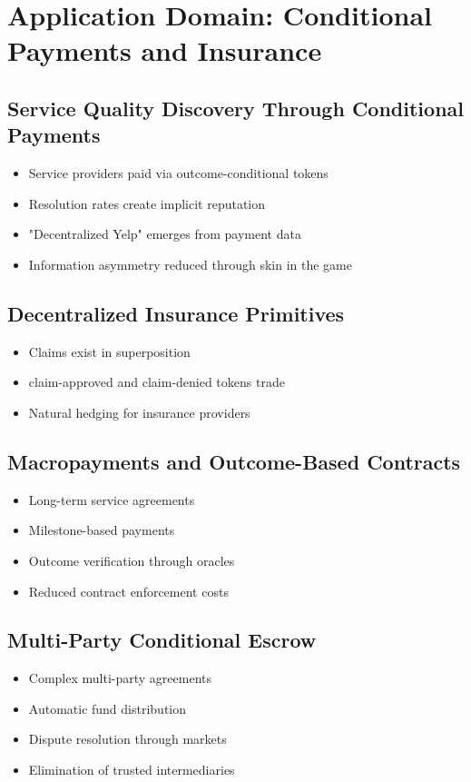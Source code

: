 \documentclass{article}
\begin{document}
\section{Application Domain: Conditional Payments and Insurance}
\subsection{Service Quality Discovery Through Conditional Payments}
\begin{itemize}
   \item Service providers paid via outcome-conditional tokens
   \item Resolution rates create implicit reputation
   \item "Decentralized Yelp" emerges from payment data
   \item Information asymmetry reduced through skin in the game
\end{itemize}

\subsection{Decentralized Insurance Primitives}
\begin{itemize}
   \item Claims exist in superposition
   \item claim-approved and claim-denied tokens trade
   \item Natural hedging for insurance providers
\end{itemize}

\subsection{Macropayments and Outcome-Based Contracts}
\begin{itemize}
    \item Long-term service agreements
    \item Milestone-based payments
    \item Outcome verification through oracles
    \item Reduced contract enforcement costs
\end{itemize}

\subsection{Multi-Party Conditional Escrow}
\begin{itemize}
    \item Complex multi-party agreements
    \item Automatic fund distribution
    \item Dispute resolution through markets
    \item Elimination of trusted intermediaries
\end{itemize}
\end{document}
